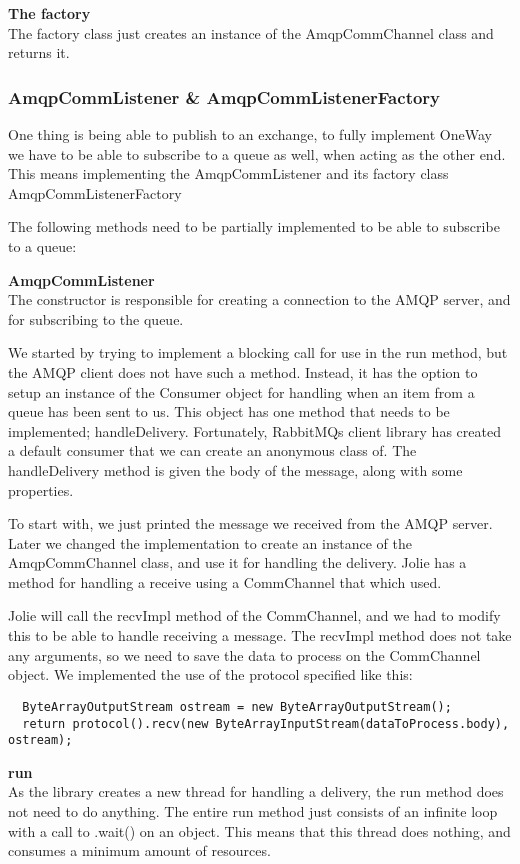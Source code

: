 \noindent\textbf{The factory}\\
The factory class just creates an instance of the AmqpCommChannel class and returns it.

\subsubsection{AmqpCommListener \& AmqpCommListenerFactory}
One thing is being able to publish to an exchange, to fully implement OneWay we have to be able to subscribe to a queue as well, when acting as the other end. This means implementing the AmqpCommListener and its factory class AmqpCommListenerFactory

The following methods need to be partially implemented to be able to subscribe to a queue:

\noindent\textbf{AmqpCommListener}\\
The constructor is responsible for creating a connection to the AMQP server, and for subscribing to the queue.

We started by trying to implement a blocking call for use in the run method, but the AMQP client does not have such a method. Instead, it has the option to setup an instance of the Consumer object for handling when an item from a queue has been sent to us. This object has one method that needs to be implemented; handleDelivery. Fortunately, RabbitMQs client library has created a default consumer that we can create an anonymous class of. The handleDelivery method is given the body of the message, along with some properties.

To start with, we just printed the message we received from the AMQP server. Later we changed the implementation to create an instance of the AmqpCommChannel class, and use it for handling the delivery. Jolie has a method for handling a receive using a CommChannel that which used.

Jolie will call the recvImpl method of the CommChannel, and we had to modify this to be able to handle receiving a message. The recvImpl method does not take any arguments, so we need to save the data to process on the CommChannel object. We implemented the use of the protocol specified like this:
\begin{lstlisting}
  ByteArrayOutputStream ostream = new ByteArrayOutputStream();
  return protocol().recv(new ByteArrayInputStream(dataToProcess.body), ostream);
\end{lstlisting}

\noindent\textbf{run}\\
As the library creates a new thread for handling a delivery, the run method does not need to do anything. The entire run method just consists of an infinite loop with a call to .wait() on an object. This means that this thread does nothing, and consumes a minimum amount of resources.

